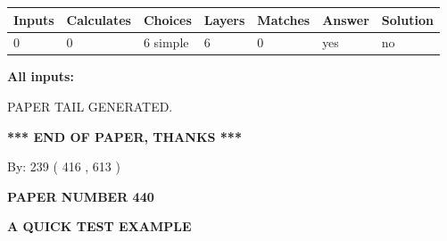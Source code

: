 \documentclass[12pt]{article}
\begin{document}
 
\noindent{}
 
 
   
   
   
   
\noindent\begin{tabular}{|l|l|l|l|l|l|l|}
 \hline
Inputs & Calculates & Choices & Layers & Matches & Answer & Solution \\ \hline
 0  & 
 0  & 
 6
  simple  
  & 
 6  & 
 0  & 
  yes & 
  no 
  \\ \hline
 \end{tabular}
   
   
   
   
\noindent{}
   
   
   
   
\noindent\vspace{0.1in}\hspace{-0.08in} {\textbf{\Large{All inputs: }}}
   
   
   
   
   
   
 \vspace{0.2in}
 
   
   
\vspace{2.0in} PAPER TAIL GENERATED.
   
   
   
   
\vspace{1.0in} 
{\textbf{\large{ *** END OF PAPER, THANKS *** }}} 
   
   
\hspace{1.0in} By: 
 239 ( 416 ,  613 )
   
   
   
   
\newpage 
\setcounter{page}{ 
   440001 } 
   
   
   
   
 {\textbf{ \Large{ PAPER NUMBER  440  }}}
   
   
\vspace{0.2in}
   
   
   
   
   
   
   
   
 \vspace{0.2in}
{\LARGE {\textbf{ A QUICK TEST EXAMPLE}}}
   
\end{document}
